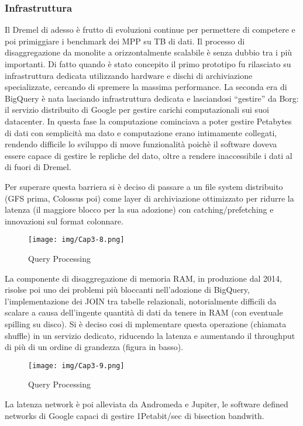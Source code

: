 \documentclass[a4paper,12pt]{report}
\begin{document}
\subsubsection{Infrastruttura}
Il Dremel di adesso è frutto di evoluzioni continue per permettere di competere e poi primiggiare i benchmark dei MPP su TB di dati. Il processo di disaggregazione da  monolite a orizzontalmente scalabile è senza dubbio tra i più importanti. Di fatto quando è stato concepito il primo prototipo fu rilasciato su infrastruttura dedicata utilizzando hardware e dischi di archiviazione specializzate, cercando di spremere la massima performance.
\noindent
La seconda era di BigQuery è nata lasciando infrastruttura dedicata e lasciandosi “gestire” da Borg: il servizio distribuito di Google per gestire carichi computazionali sui suoi datacenter. In questa fase la computazione cominciava a poter gestire Petabytes di dati con semplicità ma dato e computazione erano intimamente collegati, rendendo difficile lo sviluppo di nuove funzionalità poichè il software doveva essere capace di gestire le repliche del dato, oltre a rendere inaccessibile i dati al di fuori di Dremel.

\noindent
Per superare questa barriera si è deciso di passare a un file system distribuito (GFS prima, Colossus poi) come layer di archiviazione ottimizzato per ridurre la latenza (il maggiore blocco per la sua adozione) con catching/prefetching e innovazioni sul format colonnare.

\begin{figure}[h]
    \centering
    \texttt{[image: img/Cap3-8.png]}
    \caption{Query Processing}
\end{figure}

La componente di disaggregazione di memoria RAM, in produzione dal 2014, risolse poi uno dei problemi più bloccanti nell’adozione di BigQuery, l’implementazione dei JOIN tra tabelle relazionali, notorialmente difficili da scalare a causa dell’ingente quantità di dati da tenere in RAM (con eventuale spilling su disco). Si è deciso cosi di mplementare questa operazione (chiamata shuffle) in un servizio dedicato, riducendo la latenza e aumentando il throughput di più di un ordine di grandezza (figura in basso).

\begin{figure}[h]
    \centering
    \texttt{[image: img/Cap3-9.png]}
    \caption{Query Processing}
\end{figure}

La latenza network è poi alleviata da Andromeda e Jupiter, le software defined networks di Google capaci di gestire 1Petabit/sec di bisection bandwith. 
\end{document}
